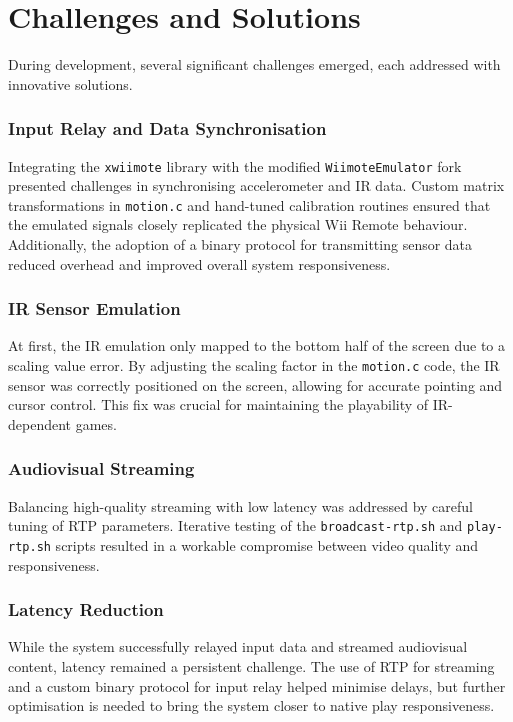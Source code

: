 \section{Challenges and Solutions}

During development, several significant challenges emerged, each addressed with innovative solutions.

\subsubsection{Input Relay and Data Synchronisation}
Integrating the \texttt{xwiimote} library with the modified \texttt{WiimoteEmulator} fork presented challenges in synchronising accelerometer and IR data. Custom matrix transformations in \texttt{motion.c} and hand-tuned calibration routines ensured that the emulated signals closely replicated the physical Wii Remote behaviour. Additionally, the adoption of a binary protocol for transmitting sensor data reduced overhead and improved overall system responsiveness.

\subsubsection{IR Sensor Emulation}
At first, the IR emulation only mapped to the bottom half of the screen due to a scaling value error. By adjusting the scaling factor in the \texttt{motion.c} code, the IR sensor was correctly positioned on the screen, allowing for accurate pointing and cursor control. This fix was crucial for maintaining the playability of IR-dependent games.

\subsubsection{Audiovisual Streaming}
Balancing high-quality streaming with low latency was addressed by careful tuning of RTP parameters. Iterative testing of the \texttt{broadcast-rtp.sh} and \texttt{play-rtp.sh} scripts resulted in a workable compromise between video quality and responsiveness.

\subsubsection{Latency Reduction}
While the system successfully relayed input data and streamed audiovisual content, latency remained a persistent challenge. The use of RTP for streaming and a custom binary protocol for input relay helped minimise delays, but further optimisation is needed to bring the system closer to native play responsiveness.

